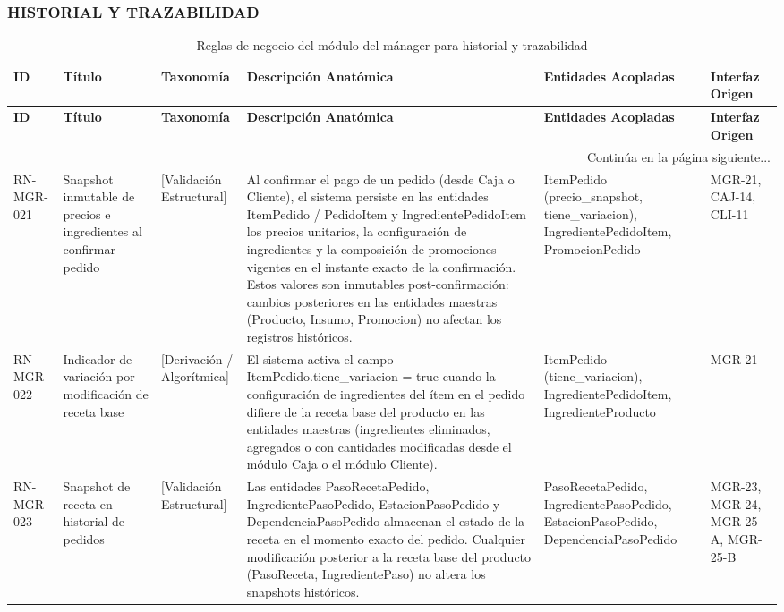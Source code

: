 \begin{landscape}
\subsubsection{HISTORIAL Y TRAZABILIDAD}
\begingroup
\setlength{\LTleft}{\fill}
\setlength{\LTright}{\fill}

\begin{longtable}[c]{l p{2.1cm} p{2.1cm} p{8cm} p{4cm} p{3cm}}
\caption{Reglas de negocio del módulo del mánager para historial y trazabilidad} \label{tab:reglas-negocio-manager-historial-trazabilidad}\\
\toprule
\textbf{ID} & \textbf{Título} & \textbf{Taxonomía} & \textbf{Descripción Anatómica} & \textbf{Entidades Acopladas} & \textbf{Interfaz Origen} \\
\midrule
\endfirsthead

\toprule
\textbf{ID} & \textbf{Título} & \textbf{Taxonomía} & \textbf{Descripción Anatómica} & \textbf{Entidades Acopladas} & \textbf{Interfaz Origen} \\
\midrule
\endhead

\midrule
\multicolumn{6}{r}{\small Continúa en la página siguiente...} \\
\endfoot
\bottomrule
\endlastfoot

RN-MGR-021 & Snapshot inmutable de precios e ingredientes al confirmar pedido & [Validación Estructural] & Al confirmar el pago de un pedido (desde Caja o Cliente), el sistema persiste en las entidades ItemPedido / PedidoItem y IngredientePedidoItem los precios unitarios, la configuración de ingredientes y la composición de promociones vigentes en el instante exacto de la confirmación. Estos valores son inmutables post-confirmación: cambios posteriores en las entidades maestras (Producto, Insumo, Promocion) no afectan los registros históricos. & ItemPedido (precio\_snapshot, tiene\_variacion), IngredientePedidoItem, PromocionPedido & MGR-21, CAJ-14, CLI-11 \\
\addlinespace
RN-MGR-022 & Indicador de variación por modificación de receta base & [Derivación / Algorítmica] & El sistema activa el campo ItemPedido.tiene\_variacion = true cuando la configuración de ingredientes del ítem en el pedido difiere de la receta base del producto en las entidades maestras (ingredientes eliminados, agregados o con cantidades modificadas desde el módulo Caja o el módulo Cliente). & ItemPedido (tiene\_variacion), IngredientePedidoItem, IngredienteProducto & MGR-21 \\
\addlinespace
RN-MGR-023 & Snapshot de receta en historial de pedidos & [Validación Estructural] & Las entidades PasoRecetaPedido, IngredientePasoPedido, EstacionPasoPedido y DependenciaPasoPedido almacenan el estado de la receta en el momento exacto del pedido. Cualquier modificación posterior a la receta base del producto (PasoReceta, IngredientePaso) no altera los snapshots históricos. & PasoRecetaPedido, IngredientePasoPedido, EstacionPasoPedido, DependenciaPasoPedido & MGR-23, MGR-24, MGR-25-A, MGR-25-B \\
\end{longtable}
\endgroup


\end{landscape}
